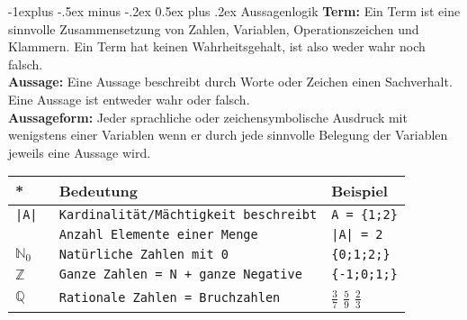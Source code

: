 \documentclass[10pt,landscape]{article}
\makeatletter
\renewcommand{\subsection}{\@startsection{subsection}{2}{0mm}%
                                {-1explus -.5ex minus -.2ex}%
                                {0.5ex plus .2ex}%
                                {\normalfont\normalsize\bfseries}}
\makeatother
\begin{document}
\begin{multicols}{3}

    \subsection{Aussagenlogik}
    \textbf{Term:}  Ein Term ist eine sinnvolle Zusammensetzung von Zahlen,
    Variablen, Operationszeichen und Klammern.
    Ein Term hat keinen Wahrheitsgehalt, ist also weder wahr noch falsch. \\[2mm]
    \textbf{Aussage:}
    Eine Aussage beschreibt durch Worte oder Zeichen einen Sachverhalt.
    Eine Aussage ist entweder wahr oder falsch. \\[2mm]
    \textbf{Aussageform:}
    Jeder sprachliche oder zeichensymbolische Ausdruck mit wenigstens einer Variablen
    wenn er durch jede sinnvolle Belegung der Variablen jeweils eine Aussage wird.
    \begin{tabular}{l|l|l}
        \textbf{*}         & \textbf{Bedeutung}                         & \textbf{Beispiel}                            \\ \hline
        \verb!|A| !        & \verb!Kardinalität/Mächtigkeit beschreibt! & \verb!A = {1;2}!                             \\
                           & \verb!Anzahl Elemente einer Menge!         & \verb!|A| = 2!                               \\ \hline
        ${\mathbb{N}}_{0}$ & \verb!Natürliche Zahlen mit 0!             & \verb!{0;1;2;}!                              \\\hline
        $\mathbb{Z}$       & \verb!Ganze Zahlen = N + ganze Negative!   & \verb!{-1;0;1;}!                             \\\hline
        $\mathbb{Q}$       & \verb!Rationale Zahlen = Bruchzahlen!      & $\frac{3}{7} $ $\frac{5}{9} $ $\frac{2}{3} $ \\\hline
    \end{tabular}


\end{multicols}
\end{document}

